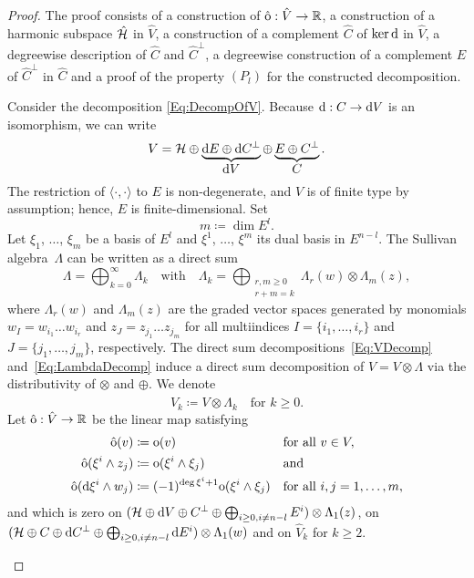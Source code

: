 \documentclass[\MainFolder/Text.tex]{subfiles}
\begin{document}
\begin{proof}
The proof consists of a construction of $\hat{\mathrm{o}}: \hat{V}\rightarrow\mathbb{R}$, a construction of a harmonic subspace $\hat{\mathcal{H}}$ in $\hat{V}$, a construction of a complement $\hat{C}$ of $\ker \mathrm{d}$ in $\hat{V}$, a degreewise description of $\hat{C}$ and $\hat{C}^\perp$, a degreewise construction of a complement $\hat{E}$ of $\hat{C}^\perp$ in $\hat{C}$ and a proof of the property $(P_l)$ for the constructed decomposition.
\begin{description}[leftmargin=0pt,font=\normalfont\itshape]
\item[Construction of $\hat{\Or}$:]
Consider the decomposition \eqref{Eq:DecompOfV}.
Because $\mathrm{d} : C \rightarrow \mathrm{d} V$ is an isomorphism, we can write
\begin{equation}\label{Eq:VDecomp}
V = \mathcal{H} \oplus \underbrace{\mathrm{d} E \oplus \mathrm{d} C^\perp}_{\displaystyle \mathrm{d} V}\oplus \underbrace{E\oplus C^\perp}_{\displaystyle C}.
\end{equation}
The restriction of $\langle\cdot,\cdot\rangle$ to $E$ is non-degenerate, and $V$ is of finite type by assumption; hence, $E$ is finite-dimensional.
Set
\[
m \coloneqq \dim E^l.
\]
Let $\xi_1$, $\dotsc$, $\xi_m$ be a basis of $E^{l}$ and $\xi^1$, $\dotsc$, $\xi^m$ its dual basis in $E^{n-l}$.
The Sullivan algebra~$\Lambda$ can be written as a direct sum 
\begin{equation}\label{Eq:LambdaDecomp}
\Lambda = \bigoplus_{k=0}^\infty \Lambda_k\quad\text{with}\quad
\Lambda_k = \bigoplus_{\substack{r, m \ge 0 \\ r + m = k}}\Lambda_r(w)\otimes \Lambda_m(z),
\end{equation}
where $\Lambda_r(w)$ and $\Lambda_m(z)$ are the graded vector spaces generated by monomials $w_I = w_{i_1}\dotsc w_{i_r}$ and $z_J = z_{j_1}\dotsc z_{j_m}$ for all multiindices $I=\{i_1, \dotsc, i_r\}$ and $J=\{j_1,\dotsc,j_m\}$, respectively.
The direct sum decompositions~\eqref{Eq:VDecomp} and~\eqref{Eq:LambdaDecomp} induce a direct sum decomposition of $\hat{V} = V \otimes \Lambda$ via the distributivity of $\otimes$ and $\oplus$.
We denote 
\[
\hat{V}_k \coloneqq V \otimes \Lambda_k\quad\text{for }k\ge 0.
\]
Let $\hat{\mathrm{o}}: \hat{V} \to \mathbb{R}$ be the linear map satisfying
\begin{align}
	\hat{\mathrm{o}}(v) &\coloneqq \mathrm{o}(v) && \text{for all }v\in V,\\
	\hat{\mathrm{o}}(\xi^i \wedge z_j) &\coloneqq \mathrm{o}(\xi^i\wedge \xi_j) && \text{and} \\
	\hat{\mathrm{o}}(\mathrm{d} \xi^i \wedge w_j) &\coloneqq (-1)^{\deg \xi^i + 1}\mathrm{o}(\xi^i \wedge \xi_j) && \text{for all }i, j = 1, \dotsc, m,
\end{align}
and which is zero on $(\mathcal{H}\oplus\mathrm{d} V\oplus C^\perp \oplus \bigoplus_{i\ge 0, i \neq n-l}E^i)\otimes \Lambda_1(z)$, on $(\mathcal{H}\oplus C \oplus \mathrm{d} C^\perp \oplus \bigoplus_{i\ge 0, i\neq n-l} \mathrm{d} E^i)\otimes\Lambda_1(w)$ and on $\hat{V}_k$ for $k \ge 2$.


\end{description}
\end{proof}
\end{document}

